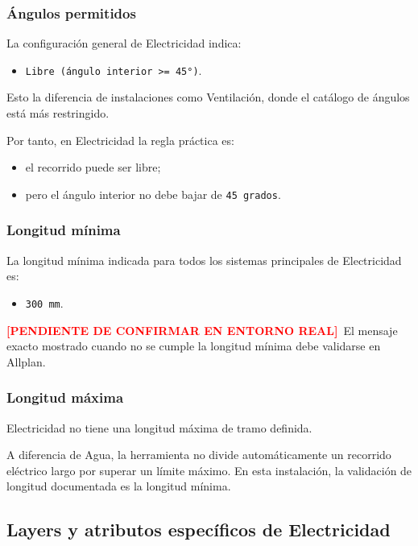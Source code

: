 \documentclass[12pt,a4paper]{article}
\newcommand{\pendingtag}{\textcolor{red}{\textbf{[PENDIENTE DE CONFIRMAR EN ENTORNO REAL]}}}
\begin{document}
\subsubsection{Ángulos permitidos}

La configuración general de Electricidad indica:

\begin{itemize}
\item \texttt{Libre (ángulo interior >= 45°)}.
\end{itemize}

Esto la diferencia de instalaciones como Ventilación, donde el catálogo de ángulos está más restringido.

Por tanto, en Electricidad la regla práctica es:

\begin{itemize}
\item el recorrido puede ser libre;
\item pero el ángulo interior no debe bajar de \texttt{45 grados}.
\end{itemize}

\subsubsection{Longitud mínima}

La longitud mínima indicada para todos los sistemas principales de Electricidad es:

\begin{itemize}
\item \texttt{300 mm}.
\end{itemize}

\pendingtag\ El mensaje exacto mostrado cuando no se cumple la longitud mínima debe validarse en Allplan.

\subsubsection{Longitud máxima}

Electricidad no tiene una longitud máxima de tramo definida.

A diferencia de Agua, la herramienta no divide automáticamente un recorrido eléctrico largo por superar un límite máximo. En esta instalación, la validación de longitud documentada es la longitud mínima.

\subsection{Layers y atributos específicos de Electricidad}
\end{document}
